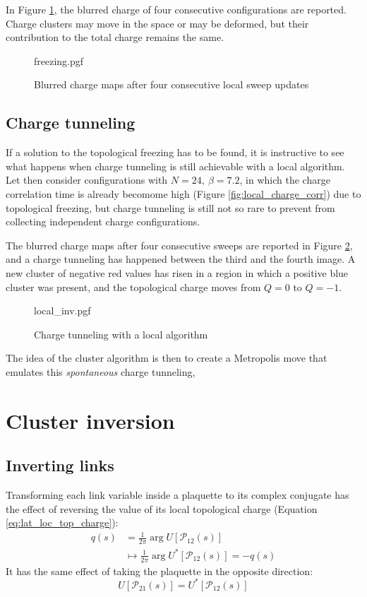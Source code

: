 In Figure \ref{fig:freezing}, the blurred charge of four consecutive configurations are reported.
Charge clusters may move in the space or may be deformed,
but their contribution to the total charge remains the same.

\begin{figure}[!htb]
    \centering
    {freezing.pgf}
    \caption{Blurred charge maps after four consecutive local sweep updates}
    \label{fig:freezing}
\end{figure}

\subsection*{Charge tunneling}
If a solution to the topological freezing has to be found,
it is instructive to see what happens when charge tunneling is still achievable with a local algorithm.
Let then consider configurations with $N=24,\ \beta=7.2$,
in which the charge correlation time is already becomome high (Figure \ref{fig:local_charge_corr}) due to topological freezing,
but charge tunneling is still not so rare to prevent from collecting independent charge configurations.

The blurred charge maps after four consecutive sweeps are reported in Figure \ref{fig:local_inv},
and a charge tunneling has happened between the third and the fourth image.
A new cluster of negative red values has risen in a region in which a positive blue cluster was present,
and the topological charge moves from $Q=0$ to $Q=-1$.

\begin{figure}[!htb]
    \centering
    {local_inv.pgf}
    \caption{Charge tunneling with a local algorithm}
    \label{fig:local_inv}
\end{figure}

The idea of the cluster algorithm is then to create a Metropolis move that emulates this \emph{spontaneous} charge tunneling,

\section{Cluster inversion}

\subsection*{Inverting links}

Transforming each link variable inside a plaquette to its complex conjugate
has the effect of reversing the value of its local topological charge (Equation \eqref{eq:lat_loc_top_charge}):
\[\begin{aligned}
    q(s) &= \frac{1}{2\pi}\arg U[\mathcal P_{12}(s)] \\
         &\mapsto \frac{1}{2\pi}\arg U^*[\mathcal P_{12}(s)] = -q(s)
\end{aligned}\]
It has the same effect of taking the plaquette in the opposite direction:
\[
    U[\mathcal P_{21}(s)] = U^*[\mathcal P_{12}(s)]
\]

